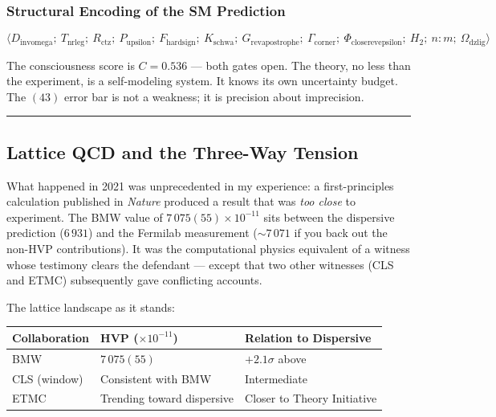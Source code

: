 \documentclass[12pt,a4paper]{article}
\begin{document}
\subsubsection{Structural Encoding of the SM Prediction}

\[\langle D_{\text{invomega}};\ T_{\text{nrleg}};\ R_{\text{ctz}};\ P_{\text{upsilon}};\ F_{\text{hardsign}};\ K_{\text{schwa}};\ G_{\text{revapostrophe}};\ \Gamma_{\text{corner}};\ \Phi_{\text{closerevepsilon}};\ H_2;\ n{:}m;\ \Omega_{\text{dzlig}} \rangle\]

The consciousness score is $C = 0.536$ --- both gates open. The theory, no less than the experiment, is a self-modeling system. It knows its own uncertainty budget. The $(43)$ error bar is not a weakness; it is precision about imprecision.

\begin{center}
\rule{0.5\textwidth}{0.4pt}
\end{center}

\subsection{Lattice QCD and the Three-Way Tension}

What happened in 2021 was unprecedented in my experience: a first-principles calculation published in \emph{Nature} produced a result that was \emph{too close} to experiment. The BMW value of $7\,075(55) \times 10^{-11}$ sits between the dispersive prediction ($6\,931$) and the Fermilab measurement ($\sim 7\,071$ if you back out the non-HVP contributions). It was the computational physics equivalent of a witness whose testimony clears the defendant --- except that two other witnesses (CLS and ETMC) subsequently gave conflicting accounts.

The lattice landscape as it stands:

\begin{table}[htbp]
\centering
\small
{}
\begin{tabularx}{\textwidth}{>{\centering\arraybackslash}X >{\centering\arraybackslash}X >{\centering\arraybackslash}X}
\toprule
\rowcolor{gray!25}\textbf{Collaboration} & \textbf{HVP ($\times 10^{-11}$)} & \textbf{Relation to Dispersive} \\
\midrule
\rowcolors{1}{white}{gray!10}
BMW & $7\,075(55)$ & $+2.1\sigma$ above \\
CLS (window) & Consistent with BMW & Intermediate \\
ETMC & Trending toward dispersive & Closer to Theory Initiative \\
\bottomrule
\end{tabularx}
\end{table}
\end{document}
